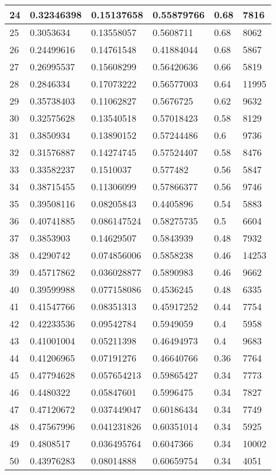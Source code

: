 \begin{longtable}{|l|l|l|l|l|l|}
24 & 0.32346398 & 0.15137658 & 0.55879766 & 0.68 & 7816 \\ \hline 
25 & 0.3053634 & 0.13558057 & 0.5608711 & 0.68 & 8062 \\ \hline 
26 & 0.24499616 & 0.14761548 & 0.41884044 & 0.68 & 5867 \\ \hline 
27 & 0.26995537 & 0.15608299 & 0.56420636 & 0.66 & 5819 \\ \hline 
28 & 0.2846334 & 0.17073222 & 0.56577003 & 0.64 & 11995 \\ \hline 
29 & 0.35738403 & 0.11062827 & 0.5676725 & 0.62 & 9632 \\ \hline 
30 & 0.32575628 & 0.13540518 & 0.57018423 & 0.58 & 8129 \\ \hline 
31 & 0.3850934 & 0.13890152 & 0.57244486 & 0.6 & 9736 \\ \hline 
32 & 0.31576887 & 0.14274745 & 0.57524407 & 0.58 & 8476 \\ \hline 
33 & 0.33582237 & 0.1510037 & 0.577482 & 0.56 & 5847 \\ \hline 
34 & 0.38715455 & 0.11306099 & 0.57866377 & 0.56 & 9746 \\ \hline 
35 & 0.39508116 & 0.08205843 & 0.4405896 & 0.54 & 5883 \\ \hline 
36 & 0.40741885 & 0.086147524 & 0.58275735 & 0.5 & 6604 \\ \hline 
37 & 0.3853903 & 0.14629507 & 0.5843939 & 0.48 & 7932 \\ \hline 
38 & 0.4290742 & 0.074856006 & 0.5858238 & 0.46 & 14253 \\ \hline 
39 & 0.45717862 & 0.036028877 & 0.5890983 & 0.46 & 9662 \\ \hline 
40 & 0.39599988 & 0.077158086 & 0.4536245 & 0.48 & 6335 \\ \hline 
41 & 0.41547766 & 0.08351313 & 0.45917252 & 0.44 & 7754 \\ \hline 
42 & 0.42233536 & 0.09542784 & 0.5949059 & 0.4 & 5958 \\ \hline 
43 & 0.41001004 & 0.05211398 & 0.46494973 & 0.4 & 9683 \\ \hline 
44 & 0.41206965 & 0.07191276 & 0.46640766 & 0.36 & 7764 \\ \hline 
45 & 0.47794628 & 0.057654213 & 0.59865427 & 0.34 & 7773 \\ \hline 
46 & 0.4480322 & 0.05847601 & 0.5996475 & 0.34 & 7827 \\ \hline 
47 & 0.47120672 & 0.037449047 & 0.60186434 & 0.34 & 7749 \\ \hline 
48 & 0.47567996 & 0.041231826 & 0.60351014 & 0.34 & 5925 \\ \hline 
49 & 0.4808517 & 0.036495764 & 0.6047366 & 0.34 & 10002 \\ \hline 
50 & 0.43976283 & 0.08014888 & 0.60659754 & 0.34 & 4051 \\ \hline 
\end{longtable}